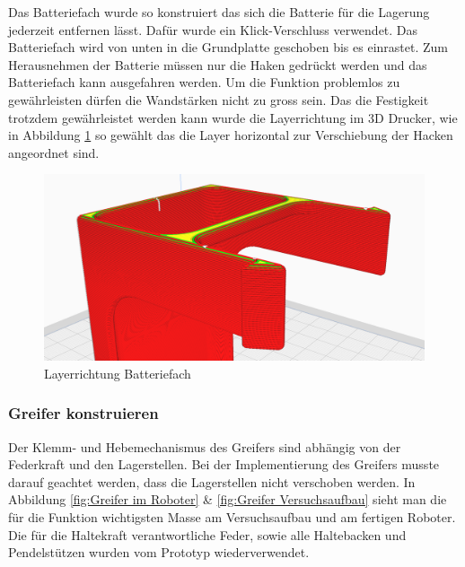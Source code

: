 Das Batteriefach wurde so konstruiert das sich die Batterie für die Lagerung jederzeit entfernen lässt. Dafür wurde ein Klick-Verschluss verwendet. Das Batteriefach wird von unten in die Grundplatte geschoben bis es einrastet. Zum Herausnehmen der Batterie müssen nur die Haken gedrückt werden und das Batteriefach kann ausgefahren werden. Um die Funktion problemlos zu gewährleisten dürfen die Wandstärken nicht zu gross sein. Das die Festigkeit trotzdem gewährleistet werden kann wurde die Layerrichtung im 3D Drucker, wie in Abbildung \ref{Layerrichtung Batteriefach} so gewählt das die Layer horizontal zur Verschiebung der Hacken angeordnet sind. 


\begin{figure}[H]
\centering
\includegraphics[width=\textwidth]{assets/MT/Layer_Batterie Fach.png}
\caption{Layerrichtung Batteriefach}
\label{Layerrichtung Batteriefach}
\end{figure}

\subsubsection{Greifer konstruieren}
\label{Greifer konstruieren}

Der Klemm- und Hebemechanismus des Greifers sind abhängig von der Federkraft und den Lagerstellen. Bei der Implementierung des Greifers musste darauf geachtet werden, dass die Lagerstellen nicht verschoben werden. In Abbildung \ref{fig:Greifer im Roboter} \& \ref{fig:Greifer Versuchsaufbau} sieht man die für die Funktion wichtigsten Masse am Versuchsaufbau und am fertigen Roboter. Die für die Haltekraft verantwortliche Feder, sowie alle Haltebacken und Pendelstützen wurden vom Prototyp wiederverwendet. 

